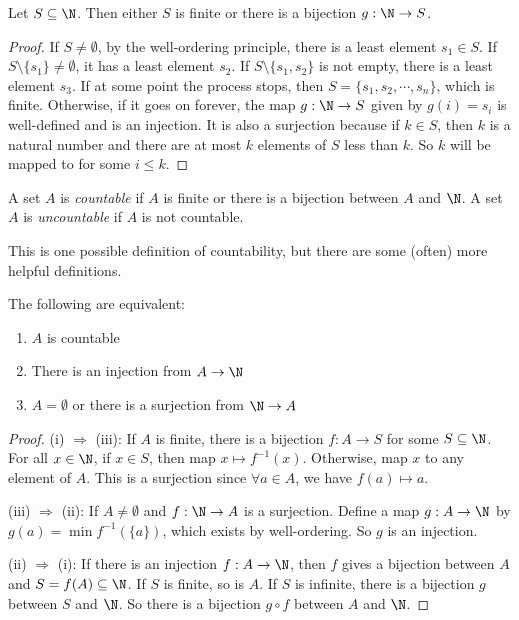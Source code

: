 \documentclass[a4paper]{article}
\begin{document}
\begin{lemma}
  Let $S\subseteq \N$. Then either $S$ is finite or there is a bijection $g:\N \to S$.
\end{lemma}

\begin{proof}
  If $S\not= \emptyset$, by the well-ordering principle, there is a least element $s_1\in S$. If $S\setminus \{s_1\} \not= \emptyset$, it has a least element $s_2$. If $S\setminus \{s_1, s_2\}$ is not empty, there is a least element $s_3$. If at some point the process stops, then $S = \{s_1, s_2,\cdots, s_n\}$, which is finite. Otherwise, if it goes on forever, the map $g: \N \to S$ given by $g(i) = s_i$ is well-defined and is an injection. It is also a surjection because if $k\in S$, then $k$ is a natural number and there are at most $k$ elements of $S$ less than $k$. So $k$ will be mapped to for some $i\leq k$.
\end{proof}

\begin{defi}
  A set $A$ is \emph{countable} if $A$ is finite or there is a bijection between $A$ and $\N$. A set $A$ is \emph{uncountable} if $A$ is not countable.
\end{defi}

This is one possible definition of countability, but there are some (often) more helpful definitions.
\begin{thm}
  The following are equivalent:
  \begin{enumerate}
    \item $A$ is countable
    \item There is an injection from $A\to \N$
    \item $A = \emptyset$ or there is a surjection from $\N \to A$
  \end{enumerate}
\end{thm}

\begin{proof}
  (i) $\Rightarrow$ (iii): If $A$ is finite, there is a bijection $f: A \to S$ for some $S\subseteq \N$. For all $x\in \N$, if $x\in S$, then map $x\mapsto f^{-1}(x)$. Otherwise, map $x$ to any element of $A$. This is a surjection since $\forall a\in A$, we have $f(a)\mapsto a$.

  (iii) $\Rightarrow$ (ii): If $A\not= \emptyset$ and $f: \N\to A$ is a surjection. Define a map $g: A\to \N$ by $g(a) = \min f^{-1}(\{a\})$, which exists by well-ordering. So $g$ is an injection.

  (ii) $\Rightarrow$ (i): If there is an injection $f: A\to \N$, then $f$ gives a bijection between $A$ and $S = f(A)\subseteq \N$. If $S$ is finite, so is $A$. If $S$ is infinite, there is a bijection $g$ between $S$ and $\N$. So there is a bijection $g\circ f$ between $A$ and $\N$.
\end{proof}
\end{document}
